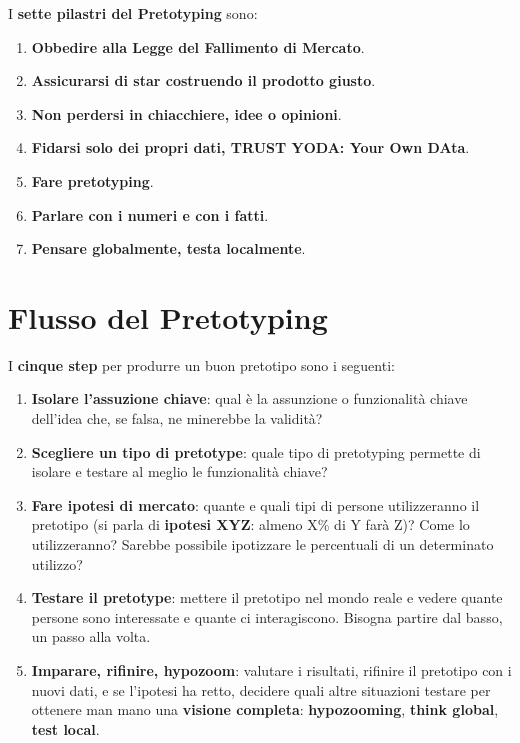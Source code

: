 I \textbf{sette pilastri del Pretotyping} sono:

\begin{enumerate}
	\itemsep-0.3em
	\item \textbf{Obbedire alla Legge del Fallimento di Mercato}.
	\item \textbf{Assicurarsi di star costruendo il prodotto giusto}.
	\item \textbf{Non perdersi in chiacchiere, idee o opinioni}.
	\item \textbf{Fidarsi solo dei propri dati, \textbf{TRUST YODA: Your Own DAta}}.
	\item \textbf{Fare pretotyping}.
	\item \textbf{Parlare con i numeri e con i fatti}.
	\item \textbf{Pensare globalmente, testa localmente}.
\end{enumerate}

\section{Flusso del Pretotyping}

I \textbf{cinque step} per produrre un buon pretotipo sono i seguenti:

\begin{enumerate}
	\itemsep-0.3em
	\item \textbf{Isolare l'assuzione chiave}: qual è la assunzione o funzionalità chiave dell'idea che, se falsa, ne minerebbe la validità?
	\item \textbf{Scegliere un tipo di pretotype}: quale tipo di pretotyping permette di isolare e testare al meglio le funzionalità chiave?
	\item \textbf{Fare ipotesi di mercato}: quante e quali tipi di persone utilizzeranno il pretotipo (si parla di \textbf{ipotesi XYZ}: almeno X\% di Y
	farà Z)? Come lo utilizzeranno? Sarebbe possibile ipotizzare le percentuali di un determinato utilizzo?
	\item \textbf{Testare il pretotype}: mettere il pretotipo nel mondo reale e vedere quante persone sono interessate e quante ci interagiscono. Bisogna
	partire dal basso, un passo alla volta.
	\item \textbf{Imparare, rifinire, hypozoom}: valutare i risultati, rifinire il pretotipo con i nuovi dati, e se l'ipotesi ha retto, decidere quali altre
	situazioni testare per ottenere man mano una \textbf{visione completa}: \textbf{hypozooming}, \textbf{think global}, \textbf{test local}.
\end{enumerate}

